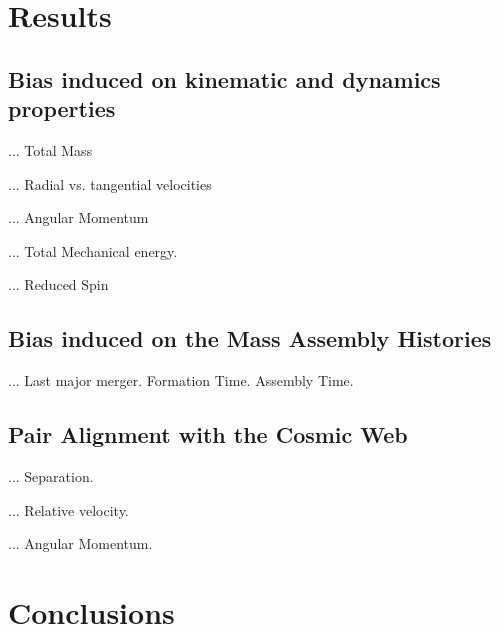 \documentclass[usenatbib]{latex/mn2e}
\begin{document}
\section{Results}
\label{sec:Results}

\subsection{Bias induced on kinematic and dynamics properties}
\label{subsec:bias_kinematic}

... Total Mass

... Radial vs. tangential velocities

... Angular Momentum

... Total Mechanical energy.

... Reduced Spin


\subsection{Bias induced on the Mass Assembly Histories}
\label{subsec:bias_MAH}

... Last major merger. Formation Time. Assembly Time.

\subsection{Pair Alignment with the Cosmic Web}
\label{subsec:alignment_cosmic_web}

... Separation.

... Relative velocity.

... Angular Momentum.


\section{Conclusions}
\label{sec:conclusions}
\end{document}
